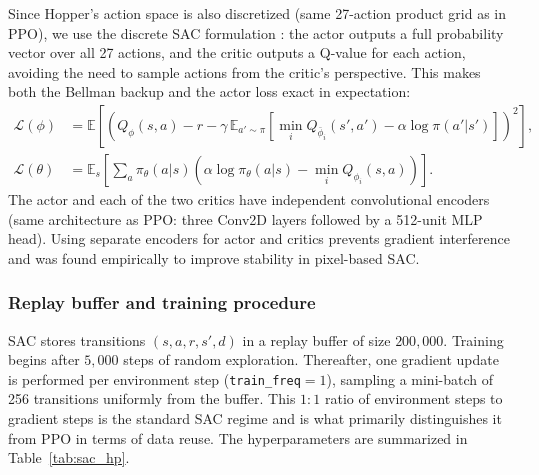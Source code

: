 \documentclass[onecolumn]{cwpreport} %
\begin{document}
Since Hopper's action space is also discretized (same 27-action product grid as in PPO), we use the discrete SAC formulation \citep{christodoulou2019soft}: the actor outputs a full probability vector over all 27 actions, and the critic outputs a Q-value for each action, avoiding the need to sample actions from the critic's perspective. This makes both the Bellman backup and the actor loss exact in expectation:
\begin{align}
    \mathcal{L}(\phi)   & = \mathbb{E}\!\left[\left(Q_\phi(s,a) - r - \gamma\, \mathbb{E}_{a' \sim \pi}[\min_i Q_{\bar\phi_i}(s',a') - \alpha\log\pi(a'|s')]\right)^2\right], \\
    \mathcal{L}(\theta) & = \mathbb{E}_{s}\!\left[\sum_a \pi_\theta(a|s)\left(\alpha\log\pi_\theta(a|s) - \min_i Q_{\phi_i}(s,a)\right)\right].
\end{align}
The actor and each of the two critics have independent convolutional encoders (same architecture as PPO: three Conv2D layers followed by a 512-unit MLP head). Using separate encoders for actor and critics prevents gradient interference and was found empirically to improve stability in pixel-based SAC.

\subsubsection{Replay buffer and training procedure}

SAC stores transitions $(s, a, r, s', d)$ in a replay buffer of size $200{,}000$. Training begins after $5{,}000$ steps of random exploration. Thereafter, one gradient update is performed per environment step (\texttt{train\_freq}$=1$), sampling a mini-batch of 256 transitions uniformly from the buffer. This $1:1$ ratio of environment steps to gradient steps is the standard SAC regime and is what primarily distinguishes it from PPO in terms of data reuse. The hyperparameters are summarized in Table~\ref{tab:sac_hp}.
\end{document}
